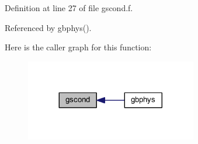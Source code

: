 Definition at line 27 of file gscond.\+f.



Referenced by gbphys().



Here is the caller graph for this function\+:
\nopagebreak
\begin{figure}[H]
\begin{center}
\leavevmode
\includegraphics[width=212pt]{gscond_8f_a02cb3895f68b86a4b7e259c8c098ecc1_icgraph}
\end{center}
\end{figure}


